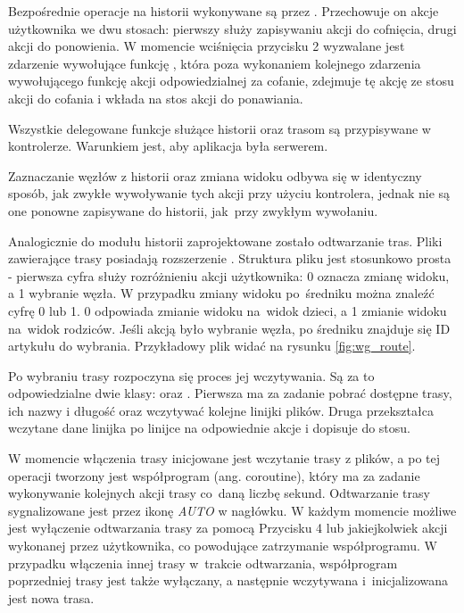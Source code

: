 Bezpośrednie operacje na historii wykonywane są przez . Przechowuje on akcje użytkownika we dwu stosach: pierwszy służy zapisywaniu akcji do cofnięcia, drugi akcji do ponowienia. W momencie wciśnięcia przycisku 2 wyzwalane jest zdarzenie wywołujące funkcję , która poza wykonaniem kolejnego zdarzenia wywołującego funkcję akcji odpowiedzialnej za cofanie, zdejmuje tę akcję ze stosu akcji do cofania i wkłada na stos akcji do ponawiania.

Wszystkie delegowane funkcje służące historii oraz trasom są przypisywane w kontrolerze\linebreak {}. Warunkiem jest, aby aplikacja była serwerem.

Zaznaczanie węzłów z historii oraz zmiana widoku odbywa się w identyczny sposób, jak zwykłe wywoływanie tych akcji przy użyciu kontrolera, jednak nie są one ponowne zapisywane do historii, jak~przy zwykłym wywołaniu.

Analogicznie do modułu historii zaprojektowane zostało odtwarzanie tras. Pliki zawierające trasy posiadają rozszerzenie . Struktura pliku jest stosunkowo prosta - pierwsza cyfra służy rozróżnieniu akcji użytkownika: 0 oznacza zmianę widoku, a 1 wybranie węzła. W przypadku zmiany widoku po~średniku można znaleźć cyfrę 0 lub 1. 0 odpowiada zmianie widoku na~widok dzieci, a 1 zmianie widoku na~widok rodziców. Jeśli akcją było wybranie węzła, po średniku znajduje się ID artykułu do wybrania. Przykładowy plik widać na rysunku \ref{fig:wg_route}.


Po wybraniu trasy rozpoczyna się proces jej wczytywania. Są za to odpowiedzialne dwie klasy:  oraz . Pierwsza ma za zadanie pobrać dostępne trasy, ich nazwy i długość oraz wczytywać kolejne linijki plików. Druga przekształca wczytane dane linijka po linijce na odpowiednie akcje i dopisuje do stosu.

W momencie włączenia trasy inicjowane jest wczytanie trasy z plików, a po tej operacji tworzony jest współprogram (ang. coroutine), który ma za zadanie wykonywanie kolejnych akcji trasy co~daną liczbę sekund. Odtwarzanie trasy sygnalizowane jest przez ikonę \textit{AUTO} w nagłówku. W każdym momencie możliwe jest wyłączenie odtwarzania trasy za pomocą Przycisku 4 lub jakiejkolwiek akcji wykonanej przez użytkownika, co powodujące zatrzymanie współprogramu. W przypadku włączenia innej trasy w~trakcie odtwarzania, współprogram poprzedniej trasy jest także wyłączany, a następnie wczytywana i~inicjalizowana jest nowa trasa. 
